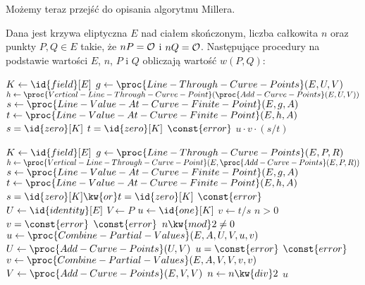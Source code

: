 \noindent
Możemy teraz przejść do opisania algorytmu Millera.

\begin{algorithm}\label{miller_alg}
Dana jest krzywa eliptyczna $E$ nad ciałem skończonym,
liczba całkowita $n$
oraz punkty $P, Q \in E$ takie, że $nP = \mathcal{O}$ i $nQ = \mathcal{O}$.
Następujące procedury
na podstawie wartości $E$, $n$, $P$ i $Q$
obliczają
wartość $w(P, Q)$:

\begin{codebox}
\li
    $K \gets \id{field}[E]$
\li
    $g \gets \proc{Line-Through-Curve-Points}(E, U, V)$
\li
    $h \gets \proc{Vertical-Line-Through-Curve-Point}(\proc{Add-Curve-Points}(E, U, V))$
\li
    $s \gets \proc{Line-Value-At-Curve-Finite-Point}(E, g, A)$
\li
    $t \gets \proc{Line-Value-At-Curve-Finite-Point}(E, h, A)$
\li
    \If $s = \id{zero}[K]$  $t = \id{zero}[K]$
\li
        \Then \Return $\const{error}$
    \End
\li
    \Return $u \cdot v \cdot (s / t)$
\end{codebox}

\begin{codebox}
\li
    $K \gets \id{field}[E]$
\li
    $g \gets \proc{Line-Through-Curve-Points}(E, P, R)$
\li
    $h \gets \proc{Vertical-Line-Through-Curve-Point}(E, \proc{Add-Curve-Points}(E, P, R))$
\li
    $s \gets \proc{Line-Value-At-Curve-Finite-Point}(E, g, A)$
\li
    $t \gets \proc{Line-Value-At-Curve-Finite-Point}(E, h, A)$
\li
    \If $s = \id{zero}[K] \kw{ or } t = \id{zero}[K]$
\li
    \Then
        \Return $\const{error}$
    \End
\li
    $U \gets \id{identity}[E]$
\li
    $V \gets P$
\li
    $u \gets \id{one}[K]$
\li
    $v \gets t / s$
\li
    \While $n > 0$
\li
        \Do
            \If $v = \const{error}$
\li
                \Then
                    \Return $\const{error}$
                \End
\li
            \If $n \kw{ mod } 2 \neq 0$
\li
                \Then
                    $u \gets \proc{Combine-Partial-Values}(E, A, U, V, u, v)$
\li
                    $U \gets \proc{Add-Curve-Points}(U, V)$
\li
                    \If $u = \const{error}$
\li
                        \Then
                            \Return $\const{error}$
                        \End
                \End
\li
            $v \gets \proc{Combine-Partial-Values}(E, A, V, V, v, v)$
\li
            $V \gets \proc{Add-Curve-Points}(E, V, V)$
\li
            $n \gets n \kw{ div } 2$
        \End
\li
    \Return $u$
\end{codebox}


\end{algorithm}

